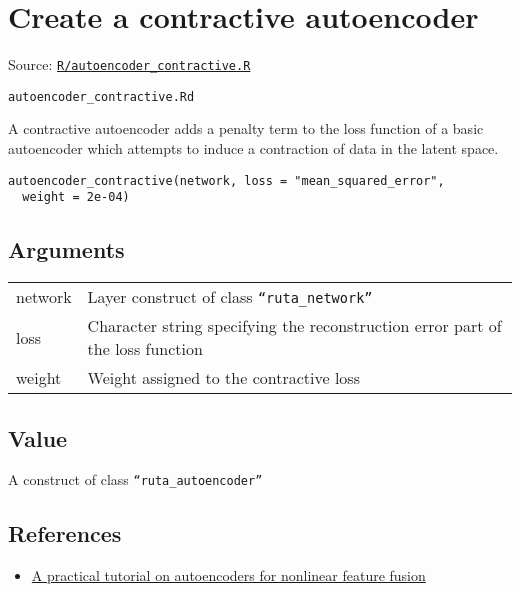 \section{Create a contractive
autoencoder}\label{create-a-contractive-autoencoder}

Source:
\href{https://github.com/fdavidcl/ruta/blob/master/R/autoencoder_contractive.R}{\texttt{R/autoencoder\_contractive.R}}

\texttt{autoencoder\_contractive.Rd}

A contractive autoencoder adds a penalty term to the loss function of a
basic autoencoder which attempts to induce a contraction of data in the
latent space.

\begin{verbatim}
autoencoder_contractive(network, loss = "mean_squared_error",
  weight = 2e-04)
\end{verbatim}

\hypertarget{arguments}{\subsection{\texorpdfstring{\protect\hyperlink{arguments}{}Arguments}{Arguments}}\label{arguments}}

\begin{longtable}[c]{@{}>{\small}p{3cm}>{\raggedright}p{12.5cm}@{}}
\toprule
network & Layer construct of class
\texttt{``ruta\_network''}\tabularnewline
loss & Character string specifying the reconstruction error part of the
loss function\tabularnewline
weight & Weight assigned to the contractive loss\tabularnewline
\bottomrule
\end{longtable}

\hypertarget{value}{\subsection{\texorpdfstring{\protect\hyperlink{value}{}Value}{Value}}\label{value}}

A construct of class \texttt{``ruta\_autoencoder''}

\hypertarget{references}{\subsection{\texorpdfstring{\protect\hyperlink{references}{}References}{References}}\label{references}}

\begin{itemize}
\tightlist
\item
  \href{https://arxiv.org/abs/1801.01586}{A practical tutorial on
  autoencoders for nonlinear feature fusion}
\end{itemize}

